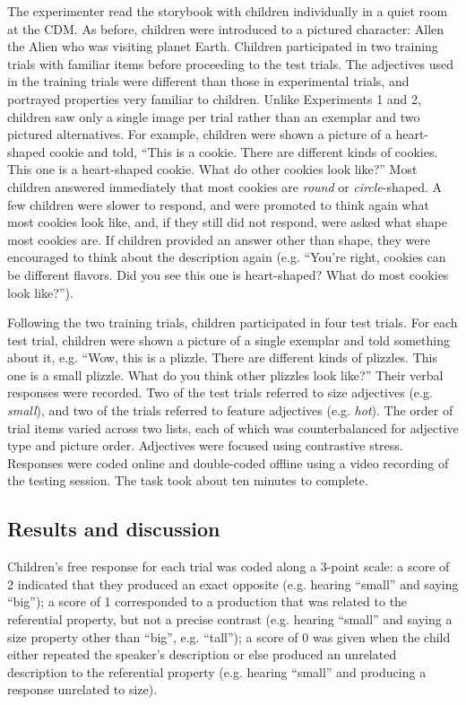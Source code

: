 \documentclass[man]{apa2}
\begin{document}
The experimenter read the storybook with children individually in a quiet room at the CDM. As before, children were introduced to a pictured character: Allen the Alien who was visiting planet Earth.  Children participated in two training trials with familiar items before proceeding to the test trials.  The adjectives used in the training trials were different than those in experimental trials, and portrayed properties very familiar to children. Unlike Experiments 1 and 2, children saw only a single image per trial rather than an exemplar and two pictured alternatives.  For example, children were shown a picture of a heart-shaped cookie and told, ``This is a cookie.  There are different kinds of cookies.  This one is a heart-shaped cookie.  What do other cookies look like?'' Most children answered immediately that most cookies are \emph{round} or \emph{circle}-shaped. A few children were slower to respond, and were promoted to think again what most cookies look like, and, if they still did not respond, were asked what shape most cookies are.  If children provided an answer other than shape, they were encouraged to think about the description again (e.g. ``You're right, cookies can be different flavors. Did you see this one is heart-shaped?  What do most cookies look like?''). 

Following the two training trials, children participated in four test trials.  For each test trial, children were shown a picture of a single exemplar and told something about it, e.g. ``Wow, this is a plizzle. There are different kinds of plizzles. This one is a small plizzle.  What do you think other plizzles look like?'' Their verbal responses were recorded.  Two of the test trials referred to size adjectives (e.g. \emph{small}), and two of the trials referred to feature adjectives (e.g. \emph{hot}).  The order of trial items varied across two lists, each of which was counterbalanced for adjective type and picture order.  Adjectives were focused using contrastive stress. Responses were coded online and double-coded offline using a video recording of the testing session.  The task took about ten minutes to complete. 


\subsection{Results and discussion}

Children's free response for each trial was coded along a 3-point scale: a score of 2 indicated that they produced an exact opposite (e.g. hearing ``small'' and saying ``big''); a score of 1 corresponded to a production that was related to the referential property, but not a precise contrast (e.g. hearing ``small'' and saying a size property other than ``big'', e.g. ``tall''); a score of 0 was given when the child either repeated the speaker's description or else produced an unrelated description to the referential property (e.g. hearing ``small'' and producing a response unrelated to size).  
\end{document}
